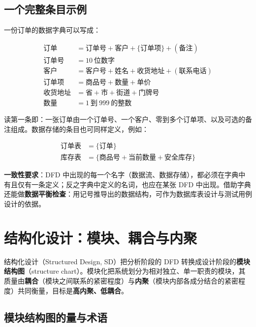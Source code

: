 \subsection{一个完整条目示例}

一份订单的数据字典可以写成：

\begin{align*}
\text{订单} &= \text{订单号} + \text{客户} + \{\text{订单项}\} + (\text{备注}) \\
\text{订单号} &= 10\ \text{位数字} \\
\text{客户} &= \text{客户号} + \text{姓名} + \text{收货地址} + (\text{联系电话}) \\
\text{订单项} &= \text{商品号} + \text{数量} + \text{单价} \\
\text{收货地址} &= \text{省} + \text{市} + \text{街道} + \text{门牌号} \\
\text{数量} &= 1\ \text{到}\ 999\ \text{的整数}
\end{align*}

读第一条即：一张订单由一个订单号、一个客户、零到多个订单项、以及可选的备注组成。数据存储的条目也可同样定义，例如：

\begin{align*}
\text{订单表} &= \{\text{订单}\} \\
\text{库存表} &= \{\text{商品号} + \text{当前数量} + \text{安全库存}\}
\end{align*}

\textbf{一致性要求}：DFD 中出现的每一个名字（数据流、数据存储），都必须在字典中有且仅有一条定义；反之字典中定义的名词，也应在某张 DFD 中出现。借助字典还能做\textbf{数据平衡检查}：用记号推导出的数据结构，可作为数据库表设计与测试用例设计的依据。

\section{结构化设计：模块、耦合与内聚}

结构化设计（Structured Design, SD）把分析阶段的 DFD 转换成设计阶段的\textbf{模块结构图}（structure chart）。模块化把系统划分为相对独立、单一职责的模块，其质量由\textbf{耦合}（模块之间联系的紧密程度）与\textbf{内聚}（模块内部各成分结合的紧密程度）共同衡量，目标是\textbf{高内聚、低耦合}。

\subsection{模块结构图的量与术语}

